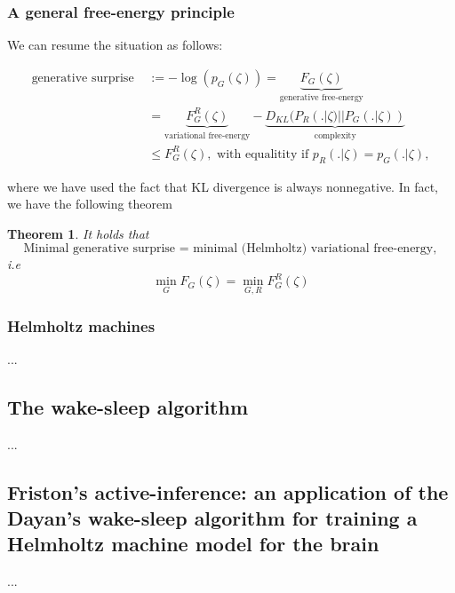 \documentclass{article} %
\newtheorem{theorem}{Theorem} \newtheorem{lemma}[theorem]{Lemma}
\begin{document}
\subsubsection{A general free-energy principle}
We can resume the situation as follows:
\begin{mdframed}
\begin{equation}
  \begin{split}
    \text{generative surprise } &:= -\log(p_G(\zeta)) = \underbrace{F_G(\zeta)}_{\text{generative free-energy}} \\
    &=\underbrace{F^R_G(\zeta)}_{\text{variational free-energy}} - \underbrace{D_{KL}(P_R(.|\zeta) || P_G(.|\zeta))}_{\text{complexity}} \\
    &\le F^R_G(\zeta),
    \text{ with equalitity if }p_R(.|\zeta) = p_G(.|\zeta),
    \end{split}
\end{equation}
\end{mdframed}
where we have used the fact that KL divergence is always nonnegative. In fact, we have the following theorem
\begin{theorem}
  It holds that
  $$
  \text{Minimal generative surprise = minimal (Helmholtz) variational free-energy},$$
  i.e
  \begin{equation}
    \min_{G}F_G(\zeta) = \min_{G,R}F^R_G(\zeta)
    \end{equation}
\end{theorem}

\subsubsection{Helmholtz machines}
...
\subsection{The wake-sleep algorithm}
...
\subsection{Friston's active-inference: an application of the Dayan's wake-sleep algorithm for training a Helmholtz machine model for the brain}
...
\end{document}

